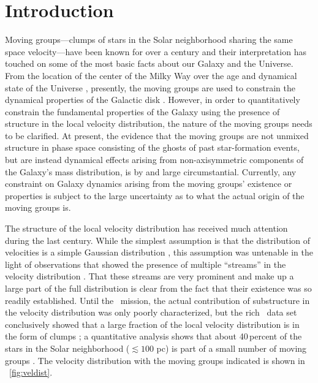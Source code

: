 \section{Introduction}\label{sec:intro}

Moving groups---clumps of stars in the Solar neighborhood sharing the
same space velocity---have been known for over a century
\citep{1846AN.....24..213M,proctor69a} and their interpretation has touched on
some of the most basic facts about our Galaxy and the Universe. From
the location of the center of the Milky Way \citep{madler47} over the
age and dynamical state of the Universe
\citep{Jeans15a,Jeans35a,Bok46a}, presently, the moving groups are
used to constrain the dynamical properties of the Galactic disk
\citep[\eg,][]{dehnen00a,Quillen05a}. However, in order to
quantitatively constrain the fundamental properties of the Galaxy
using the presence of structure in the local velocity distribution,
the nature of the moving groups needs to be clarified. At present, the
evidence that the moving groups are not unmixed structure in phase
space consisting of the ghosts of past star-formation events, but are
instead dynamical effects arising from non-axisymmetric components of
the Galaxy's mass distribution, is by and large
circumstantial. Currently, any constraint on Galaxy dynamics arising
from the moving groups' existence or properties is subject to the
large uncertainty as to what the actual origin of the moving groups
is.

The structure of the local velocity distribution has received much
attention during the last century. While the simplest assumption is
that the distribution of velocities is a simple Gaussian distribution
\citep{schwarzschild07a}, this assumption was untenable in the light
of observations that showed the presence of multiple ``streams'' in
the velocity distribution \citep{kapteyn05a,1910MNRAS..71...43E}. That
these streams are very prominent and make up a large part of the full
distribution is clear from the fact that their existence was so
readily established. Until the \Hipparcos\ mission, the actual
contribution of substructure in the velocity distribution was only
poorly characterized, but the rich \Hipparcos\ data set conclusively
showed that a large fraction of the local velocity distribution is in
the form of clumps \citep{1998AJ....115.2384D,1999MNRAS.308..731S}; a
quantitative analysis shows that about 40\,percent of the stars in the
Solar neighborhood ($\lesssim 100$ pc) is part of a small number of
moving groups \citep{Bovyveldist}. The velocity distribution with the
moving groups indicated is shown in \figurename~\ref{fig:veldist}.

